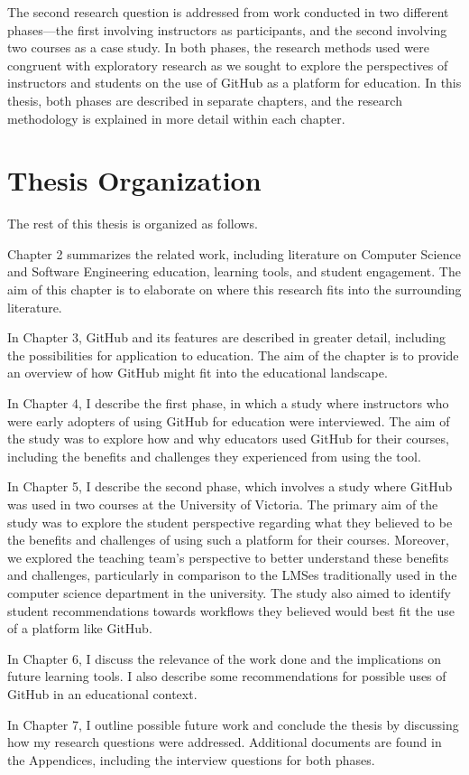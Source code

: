 The second research question is addressed from work conducted in two different phases---the first involving instructors as participants, and the second involving two courses as a case study. In both phases, the research methods used were congruent with exploratory research as we sought to explore the perspectives of instructors and students on the use of GitHub as a platform for education. In this thesis, both phases are described in separate chapters, and the research methodology is explained in more detail within each chapter.

\section{Thesis Organization}
The rest of this thesis is organized as follows.

Chapter 2 summarizes the related work, including literature on Computer Science and Software Engineering education, learning tools, and student engagement. The aim of this chapter is to elaborate on where this research fits into the surrounding literature.

In Chapter 3, GitHub and its features are described in greater detail, including the possibilities for application to education. The aim of the chapter is to provide an overview of how GitHub might fit into the educational landscape.

In Chapter 4, I describe the first phase, in which a study where instructors who were early adopters of using GitHub for education were interviewed. The aim of the study was to explore how and why educators used GitHub for their courses, including the benefits and challenges they experienced from using the tool.

In Chapter 5, I describe the second phase, which involves a study where GitHub was used in two courses at the University of Victoria. The primary aim of the study was to explore the student perspective regarding what they believed to be the benefits and challenges of using such a platform for their courses. Moreover, we explored the teaching team's perspective to better understand these benefits and challenges, particularly in comparison to the LMSes traditionally used in the computer science department in the university. The study also aimed to identify student recommendations towards workflows they believed would best fit the use of a platform like GitHub.

In Chapter 6, I discuss the relevance of the work done and the implications on future learning tools. I also describe some recommendations for possible uses of GitHub in an educational context.

In Chapter 7, I outline possible future work and conclude the thesis by discussing how my research questions were addressed. Additional documents are found in the Appendices, including the interview questions for both phases.



